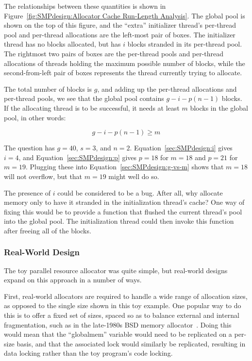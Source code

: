 {	The relationships between these quantities is shown in
	Figure~\ref{fig:SMPdesign:Allocator Cache Run-Length Analysis}.
	The global pool is shown on the top of this figure, and
	the ``extra'' initializer thread's per-thread pool and
	per-thread allocations are the left-most pair of boxes.
	The initializer thread has no blocks allocated, but has
	$i$ blocks stranded in its per-thread pool.
	The rightmost two pairs of boxes are the per-thread pools and
	per-thread allocations of threads holding the maximum possible
	number of blocks, while the second-from-left pair of boxes
	represents the thread currently trying to allocate.

	The total number of blocks is $g$, and adding up the per-thread
	allocations and per-thread pools, we see that the global pool
	contains $g-i-p(n-1)$ blocks.
	If the allocating thread is to be successful, it needs at least
	$m$ blocks in the global pool, in other words:

	\begin{equation}
		g - i - p(n - 1) \ge m
	\label{sec:SMPdesign:g-vs-m}
	\end{equation}

	The question has $g=40$, $s=3$, and $n=2$.
	Equation~\ref{sec:SMPdesign:i} gives $i=4$, and
	Equation~\ref{sec:SMPdesign:p} gives $p=18$ for $m=18$
	and $p=21$ for $m=19$.
	Plugging these into Equation~\ref{sec:SMPdesign:g-vs-m}
	shows that $m=18$ will not overflow, but that $m=19$ might
	well do so.

	The presence of $i$ could be considered to be a bug.
	After all, why allocate memory only to have it stranded in
	the initialization thread's cache?
	One way of fixing this would be to provide a 
	function that flushed the current thread's pool into the
	global pool.
	The initialization thread could then invoke this function
	after freeing all of the blocks.
} \QuickQuizEnd

\subsubsection{Real-World Design}

The toy parallel resource allocator was quite simple, but real-world
designs expand on this approach in a number of ways.

First, real-world allocators are required to handle a wide range
of allocation sizes, as opposed to the single size shown in this
toy example.
One popular way to do this is to offer a fixed set of sizes, spaced
so as to balance external and internal fragmentation, such as in
the late-1980s BSD memory allocator~\cite{McKusick88}.
Doing this would mean that the ``globalmem'' variable would need
to be replicated on a per-size basis, and that the associated
lock would similarly be replicated, resulting in data locking
rather than the toy program's code locking.


